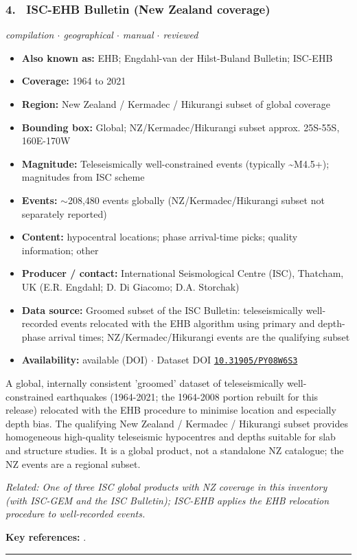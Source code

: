 \documentclass[10pt,a4paper]{article}
\newcommand{\catentryrule}{\par\vspace{3pt}\noindent\textcolor{rulegrey}{\rule{\linewidth}{0.3pt}}\par\vspace{5pt}}
\newcommand{\kv}[2]{\item \textbf{#1:} #2}
\begin{document}
\subsubsection*{\hypertarget{c:4}{4.}~ ISC-EHB Bulletin (New Zealand coverage)}
{\small\itshape compilation $\cdot$ geographical $\cdot$ manual $\cdot$ reviewed}\par\vspace{2pt}
\begin{itemize}[leftmargin=1.3em,itemsep=0.6pt,topsep=1pt,parsep=0pt]
\kv{Also known as}{EHB; Engdahl-van der Hilst-Buland Bulletin; ISC-EHB}
\kv{Coverage}{1964 to 2021}
\kv{Region}{New Zealand / Kermadec / Hikurangi subset of global coverage}
\kv{Bounding box}{Global; NZ/Kermadec/Hikurangi subset approx. 25S-55S, 160E-170W}
\kv{Magnitude}{Teleseismically well-constrained events (typically \textasciitilde{}M4.5+); magnitudes from ISC scheme}
\kv{Events}{$\sim$208,480 events globally (NZ/Kermadec/Hikurangi subset not separately reported)}
\kv{Content}{hypocentral locations; phase arrival-time picks; quality information; other}
\kv{Producer / contact}{International Seismological Centre (ISC), Thatcham, UK (E.R. Engdahl; D. Di Giacomo; D.A. Storchak)}
\kv{Data source}{Groomed subset of the ISC Bulletin: teleseismically well-recorded events relocated with the EHB algorithm using primary and depth-phase arrival times; NZ/Kermadec/Hikurangi events are the qualifying subset}
\kv{Availability}{available (DOI) $\cdot$ Dataset DOI \href{https://doi.org/10.31905/PY08W6S3}{\nolinkurl{10.31905/PY08W6S3}}}
\end{itemize}
\par\vspace{2pt}A global, internally consistent 'groomed' dataset of teleseismically well-constrained earthquakes (1964-2021; the 1964-2008 portion rebuilt for this release) relocated with the EHB procedure to minimise location and especially depth bias. The qualifying New Zealand / Kermadec / Hikurangi subset provides homogeneous high-quality teleseismic hypocentres and depths suitable for slab and structure studies. It is a global product, not a standalone NZ catalogue; the NZ events are a regional subset.
\par{\small\itshape Related: One of three ISC global products with NZ coverage in this inventory (with ISC-GEM and the ISC Bulletin); ISC-EHB applies the EHB relocation procedure to well-recorded events.}
\par\vspace{2pt}\textbf{Key references:} \cite{Weston2018,Engdahl2020,InternationalSeismologicalCentre2022}.
\catentryrule
\end{document}
